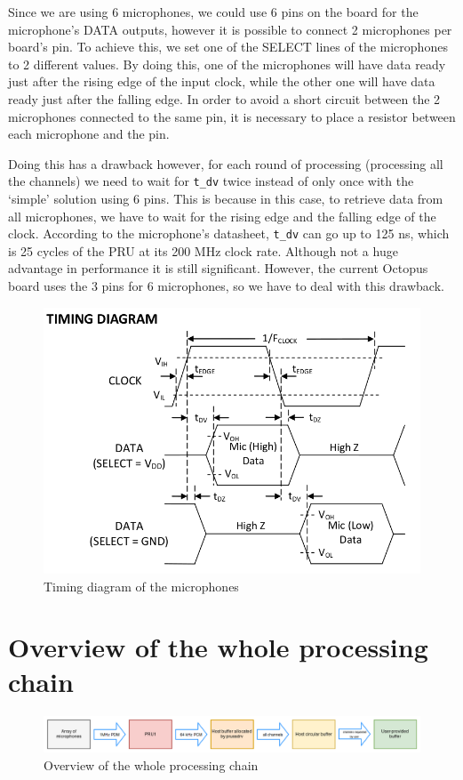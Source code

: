 \documentclass[]{report}
\begin{document}
Since we are using 6 microphones, we could use 6 pins on the board for
the microphone's DATA outputs, however it is possible to connect 2
microphones per board's pin. To achieve this, we set one of the SELECT
lines of the microphones to 2 different values. By doing this, one of
the microphones will have data ready just after the rising edge of the
input clock, while the other one will have data ready just after the
falling edge. In order to avoid a short circuit between the 2
microphones connected to the same pin, it is necessary to place a
resistor between each microphone and the pin.

Doing this has a drawback however, for each round of processing
(processing all the channels) we need to wait for \texttt{t\_dv} twice
instead of only once with the `simple' solution using 6 pins. This is
because in this case, to retrieve data from all microphones, we have to
wait for the rising edge and the falling edge of the clock. According to
the microphone's datasheet, \texttt{t\_dv} can go up to 125 ns, which is
25 cycles of the PRU at its 200 MHz clock rate. Although not a huge
advantage in performance it is still significant. However, the current
Octopus board uses the 3 pins for 6 microphones, so we have to deal with
this drawback.

\begin{figure}[h]
\centering
\includegraphics[width=0.6\linewidth]{Pictures/timing_diagram.png}
\caption{Timing diagram of the microphones}
\end{figure}

\newpage

\hypertarget{overview-of-the-whole-processing-chain}{%
\section{Overview of the whole processing
chain}\label{overview-of-the-whole-processing-chain}}

\begin{figure}[h]
\centering
\includegraphics[width=1.0\linewidth]{Pictures/PRU_processing_chain.png}
\caption{Overview of the whole processing chain}
\end{figure}
\end{document}
